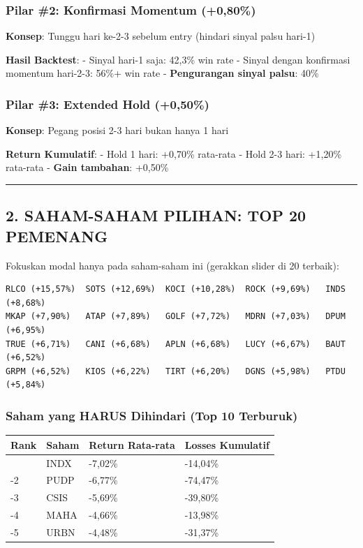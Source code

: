 \documentclass[
  10pt,
  a4paper,
]{article}
\begin{document}
\subsubsection{Pilar \#2: Konfirmasi Momentum
(+0,80\%)}\label{pilar-2-konfirmasi-momentum-080}

\textbf{Konsep}: Tunggu hari ke-2-3 sebelum entry (hindari sinyal palsu
hari-1)

\textbf{Hasil Backtest}: - Sinyal hari-1 saja: 42,3\% win rate - Sinyal
dengan konfirmasi momentum hari-2-3: 56\%+ win rate -
\textbf{Pengurangan sinyal palsu}: 40\%

\subsubsection{Pilar \#3: Extended Hold
(+0,50\%)}\label{pilar-3-extended-hold-050}

\textbf{Konsep}: Pegang posisi 2-3 hari bukan hanya 1 hari

\textbf{Return Kumulatif}: - Hold 1 hari: +0,70\% rata-rata - Hold 2-3
hari: +1,20\% rata-rata - \textbf{Gain tambahan}: +0,50\%

\begin{center}\rule{0.5\linewidth}{0.5pt}\end{center}

\subsection{2. SAHAM-SAHAM PILIHAN: TOP 20
PEMENANG}\label{saham-saham-pilihan-top-20-pemenang}

Fokuskan modal hanya pada saham-saham ini (gerakkan slider di 20
terbaik):

\begin{verbatim}
RLCO (+15,57%)  SOTS (+12,69%)  KOCI (+10,28%)  ROCK (+9,69%)   INDS (+8,68%)
MKAP (+7,90%)   ATAP (+7,89%)   GOLF (+7,72%)   MDRN (+7,03%)   DPUM (+6,95%)
TRUE (+6,71%)   CANI (+6,68%)   APLN (+6,68%)   LUCY (+6,67%)   BAUT (+6,52%)
GRPM (+6,52%)   KIOS (+6,22%)   TIRT (+6,20%)   DGNS (+5,98%)   PTDU (+5,84%)
\end{verbatim}

\subsubsection{Saham yang HARUS Dihindari (Top 10
Terburuk)}\label{saham-yang-harus-dihindari-top-10-terburuk}

\begin{longtable}[]{@{}llll@{}}
\toprule\noalign{}
Rank & Saham & Return Rata-rata & Losses Kumulatif \\
\midrule\noalign{}
\endhead
\bottomrule\noalign{}
\endlastfoot
-1 & INDX & -7,02\% & -14,04\% \\
-2 & PUDP & -6,77\% & -74,47\% \\
-3 & CSIS & -5,69\% & -39,80\% \\
-4 & MAHA & -4,66\% & -13,98\% \\
-5 & URBN & -4,48\% & -31,37\% \\
\end{longtable}
\end{document}
